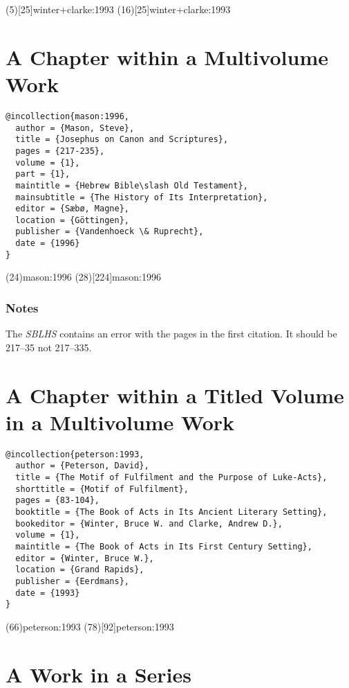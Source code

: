\documentclass[a4paper]{article}
\begin{document}
\examplecite(5)[25]{winter+clarke:1993}
\examplecite(16)[25]{winter+clarke:1993}
\examplebibliography

\section{A Chapter within a Multivolume Work}

\begin{verbatim}
@incollection{mason:1996,
  author = {Mason, Steve},
  title = {Josephus on Canon and Scriptures},
  pages = {217-235},
  volume = {1},
  part = {1},
  maintitle = {Hebrew Bible\slash Old Testament},
  mainsubtitle = {The History of Its Interpretation},
  editor = {Sæbø, Magne},
  location = {Göttingen},
  publisher = {Vandenhoeck \& Ruprecht},
  date = {1996}
}
\end{verbatim}

\examplecite(24){mason:1996}
\examplecite(28)[224]{mason:1996}
\examplebibliography

\subsubsection{Notes}

The \emph{SBLHS} contains an error with the pages in the first citation. It
should be 217–35 not 217–335.

\section{A Chapter within a Titled Volume in a Multivolume Work}

\begin{verbatim}
@incollection{peterson:1993,
  author = {Peterson, David},
  title = {The Motif of Fulfilment and the Purpose of Luke-Acts},
  shorttitle = {Motif of Fulfilment},
  pages = {83-104},
  booktitle = {The Book of Acts in Its Ancient Literary Setting},
  bookeditor = {Winter, Bruce W. and Clarke, Andrew D.},
  volume = {1},
  maintitle = {The Book of Acts in Its First Century Setting},
  editor = {Winter, Bruce W.},
  location = {Grand Rapids},
  publisher = {Eerdmans},
  date = {1993}
}
\end{verbatim}

\examplecite(66){peterson:1993}
\examplecite(78)[92]{peterson:1993}
\examplebibliography

\section{A Work in a Series}
\end{document}
